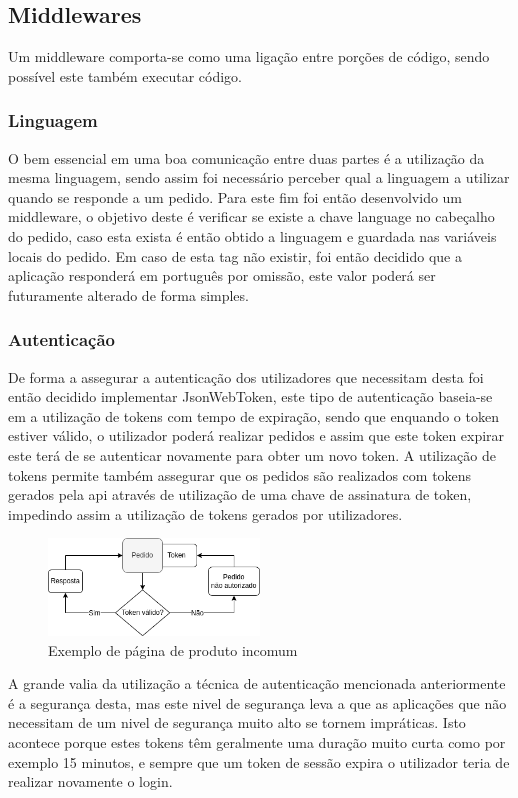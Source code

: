 \subsection{Middlewares} 
Um middleware comporta-se como uma ligação entre porções de código, sendo possível este também executar código.

\subsubsection{Linguagem}
O bem essencial em uma boa comunicação entre duas partes é a utilização da mesma linguagem, sendo assim foi necessário perceber qual a linguagem a utilizar quando se responde a um pedido. Para este fim foi então desenvolvido um middleware, o objetivo deste é verificar se existe a chave language no cabeçalho do pedido, caso esta exista é então obtido a linguagem e guardada nas variáveis locais do pedido. Em caso de esta tag não existir, foi então decidido que a aplicação responderá em português por omissão, este valor poderá ser futuramente alterado de forma simples.

\subsubsection{Autenticação}
De forma a assegurar a autenticação dos utilizadores que necessitam desta foi então decidido implementar JsonWebToken, este tipo de autenticação baseia-se em a utilização de tokens com tempo de expiração, sendo que enquando o token estiver válido, o utilizador poderá realizar pedidos e assim que este token expirar este terá de se autenticar novamente para obter um novo token.
A utilização de tokens permite também assegurar que os pedidos são realizados com tokens gerados pela api através de utilização de uma chave de assinatura de token, impedindo assim a utilização de tokens gerados por utilizadores.
\begin{figure}[htb]
  \centering
  \includegraphics[width=0.5\textwidth]{images/implementacao/api/jwt_session.png}
  \caption{Exemplo de página de produto incomum}
  \label{fig:64}
\end{figure}

A grande valia da utilização a técnica de autenticação mencionada anteriormente é a segurança desta, mas este nivel de segurança leva a que as aplicações que não necessitam de um nivel de segurança muito alto se tornem impráticas. Isto acontece porque estes  tokens têm geralmente uma duração muito curta como por exemplo 15 minutos, e sempre que um token de sessão expira o utilizador 
teria de realizar novamente o login.

